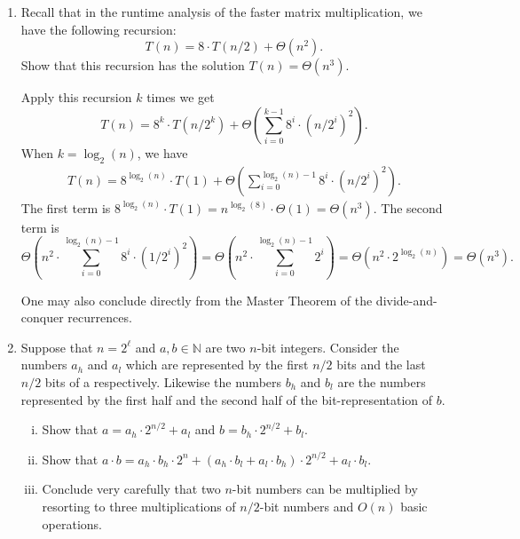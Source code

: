 \documentclass[11pt]{article}
\begin{document}
\begin{enumerate}[1)]
\begin{solution}
\begin{enumerate}[i)]
	\textbf{Error probability}: If $A \cdot B = C$, then the algorithm always returns "Yes". If $A \cdot B \neq C$, then by ii) the algorithm returns "Yes" with probability at most $1/2^k$.
\end{enumerate}
\end{solution}

\item Recall that in the runtime analysis of the faster matrix multiplication, we have the following recursion: 
\[
	T(n) = 8 \cdot T(n/2) + \Theta(n^2).
\]
Show that this recursion has the solution $T(n) = \Theta(n^3)$.

\begin{solution}
Apply this recursion $k$ times we get
\[
T(n) = 8^k \cdot T(n/2^k) + \Theta\left(\sum_{i=0}^{k-1} 8^i \cdot (n/2^i)^2\right).
\]
When $k = \log_2(n)$, we have 
\begin{align*}
T(n) = 8^{\log_2(n)} \cdot T(1) + \Theta\left(\sum_{i=0}^{\log_2(n)-1} 8^i \cdot (n/2^i)^2\right).
\end{align*}
The first term is $8^{\log_2(n)} \cdot T(1) = n^{\log_2(8)} \cdot \Theta(1) = \Theta(n^3)$. The second term is 
\[
\Theta\left(n^2 \cdot \sum_{i=0}^{\log_2(n)-1} 8^i \cdot (1/2^i)^2\right) = \Theta\left(n^2 \cdot \sum_{i=0}^{\log_2(n)-1} 2^i\right) = \Theta\left(n^2 \cdot 2^{\log_2(n)}\right) = \Theta(n^3).	
\]

One may also conclude directly from the Master Theorem of the divide-and-conquer recurrences.
\end{solution}

\item Suppose that $n=2^\ell$ and $a, b \in \mathbb{N}$ are two $n$-bit integers. Consider the numbers $a_h$ and $a_l$ which are represented by the first $n/2$ bits and the last $n/2$ bits of a respectively. Likewise the numbers $b_h$ and $b_l$ are the numbers represented by the first half and the second half of the bit-representation of $b$.
\begin{enumerate}[i)]
	\item Show that $a = a_h \cdot 2^{n/2} + a_l$ and $b = b_h \cdot 2^{n/2} + b_l$.

	\item Show that $a \cdot b = a_h \cdot b_h \cdot 2^n + (a_h \cdot b_l + a_l \cdot b_h) \cdot 2^{n/2} + a_l \cdot b_l$.		

	\item Conclude very carefully that two $n$-bit numbers can be multiplied by resorting to three multiplications of $n/2$-bit numbers and $O(n)$ basic operations. 


\end{enumerate}
\end{enumerate}
\end{document}
